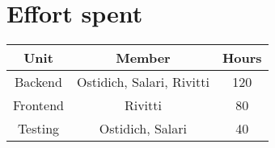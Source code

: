 \chapter{Effort spent}

\begin{table}[h]
    \centering
    \begin{tabular}{|c|c|c|}
        \hline \textbf{Unit} & \textbf{Member} & \textbf{Hours} \\
        \hline Backend & Ostidich, Salari, Rivitti & 120 \\
        \hline Frontend & Rivitti & 80 \\
        \hline Testing & Ostidich, Salari & 40 \\
        \hline
    \end{tabular}
\end{table}

